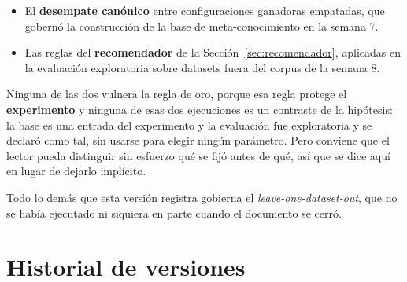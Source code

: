 \documentclass[11pt,letterpaper]{article}
\begin{document}
\begin{itemize}
  \item El \textbf{desempate canónico} entre configuraciones ganadoras
        empatadas, que gobernó la construcción de la base de meta-conocimiento en
        la semana 7.
  \item Las reglas del \textbf{recomendador} de la
        Sección~\ref{sec:recomendador}, aplicadas en la evaluación exploratoria
        sobre datasets fuera del corpus de la semana 8.
\end{itemize}

Ninguna de las dos vulnera la regla de oro, porque esa regla protege el
\textbf{experimento} y ninguna de esas dos ejecuciones es un contraste de la
hipótesis: la base es una entrada del experimento y la evaluación fue exploratoria
y se declaró como tal, sin usarse para elegir ningún parámetro. Pero conviene que
el lector pueda distinguir sin esfuerzo qué se fijó antes de qué, así que se dice
aquí en lugar de dejarlo implícito.

Todo lo demás que esta versión registra gobierna el \textit{leave-one-dataset-out},
que no se había ejecutado ni siquiera en parte cuando el documento se cerró.

\section{Historial de versiones}
\end{document}
